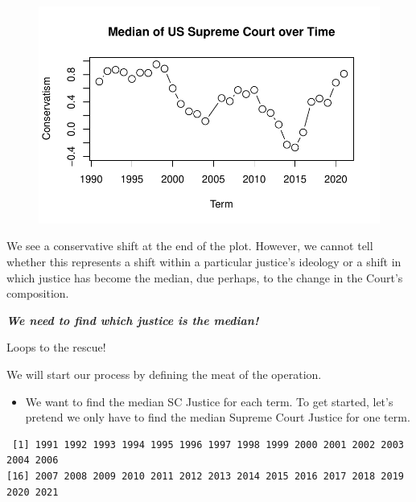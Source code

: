 \documentclass[
  letterpaper,
  DIV=11,
  numbers=noendperiod]{scrreprt}
\newenvironment{Shaded}{\begin{snugshade}}{\end{snugshade}}
\newcommand{\FunctionTok}[1]{\textcolor[rgb]{0.28,0.35,0.67}{#1}}
\newcommand{\NormalTok}[1]{\textcolor[rgb]{0.00,0.23,0.31}{#1}}
\newcommand{\OtherTok}[1]{\textcolor[rgb]{0.00,0.23,0.31}{#1}}
\newcommand{\SpecialCharTok}[1]{\textcolor[rgb]{0.37,0.37,0.37}{#1}}
\providecommand{\tightlist}{%
  \setlength{\itemsep}{0pt}\setlength{\parskip}{0pt}}\usepackage{longtable,booktabs,array}
\begin{document}
\begin{figure}[H]

{\centering \includegraphics{06-Loops_files/figure-pdf/unnamed-chunk-23-1.pdf}

}

\end{figure}

We see a conservative shift at the end of the plot. However, we cannot
tell whether this represents a shift within a particular justice's
ideology or a shift in which justice has become the median, due perhaps,
to the change in the Court's composition.

\textbf{\emph{We need to find which justice is the median!}}

Loops to the rescue!

We will start our process by defining the meat of the operation.

\begin{itemize}
\tightlist
\item
  We want to find the median SC Justice for each term. To get started,
  let's pretend we only have to find the median Supreme Court Justice
  for one term.
\end{itemize}

\begin{Shaded}
\end{Shaded}

\begin{verbatim}
 [1] 1991 1992 1993 1994 1995 1996 1997 1998 1999 2000 2001 2002 2003 2004 2006
[16] 2007 2008 2009 2010 2011 2012 2013 2014 2015 2016 2017 2018 2019 2020 2021
\end{verbatim}
\end{document}
